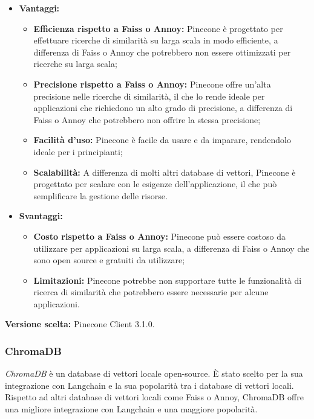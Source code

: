 \documentclass[10pt, a4paper]{article}
\begin{document}
\begin{itemize}
\item \textbf{Vantaggi:}
\begin{itemize}
\item \textbf{Efficienza rispetto a Faiss o Annoy:} Pinecone è progettato per effettuare ricerche di similarità su larga scala in modo efficiente, a differenza di Faiss o Annoy che potrebbero non essere ottimizzati per ricerche su larga scala;
\item \textbf{Precisione rispetto a Faiss o Annoy:} Pinecone offre un'alta precisione nelle ricerche di similarità, il che lo rende ideale per applicazioni che richiedono un alto grado di precisione, a differenza di Faiss o Annoy che potrebbero non offrire la stessa precisione;
\item \textbf{Facilità d'uso:} Pinecone è facile da usare e da imparare, rendendolo ideale per i principianti;
\item \textbf{Scalabilità:} A differenza di molti altri database di vettori, Pinecone è progettato per scalare con le esigenze dell'applicazione, il che può semplificare la gestione delle risorse.
\end{itemize}
\item \textbf{Svantaggi:}
\begin{itemize}
\item \textbf{Costo rispetto a Faiss o Annoy:} Pinecone può essere costoso da utilizzare per applicazioni su larga scala, a differenza di Faiss o Annoy che sono open source e gratuiti da utilizzare;
\item \textbf{Limitazioni:} Pinecone potrebbe non supportare tutte le funzionalità di ricerca di similarità che potrebbero essere necessarie per alcune applicazioni.
\end{itemize}
\end{itemize}
\textbf{Versione scelta:} Pinecone Client 3.1.0.

\subsubsection{ChromaDB}
\textit{ChromaDB\pg} è un database di vettori locale open-source. È stato scelto per la sua integrazione con Langchain e la sua popolarità tra i database di vettori locali. Rispetto ad altri database di vettori locali come Faiss o Annoy, ChromaDB offre una migliore integrazione con Langchain e una maggiore popolarità.
\end{document}
